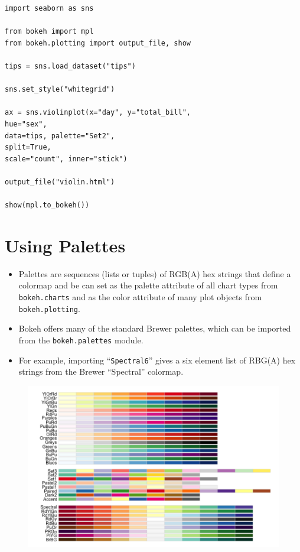 \documentclass[12pt, a4paper]{report}
\begin{document}
\begin{verbatim}
import seaborn as sns

from bokeh import mpl
from bokeh.plotting import output_file, show

tips = sns.load_dataset("tips")

sns.set_style("whitegrid")

ax = sns.violinplot(x="day", y="total_bill", 
hue="sex",
data=tips, palette="Set2", 
split=True,
scale="count", inner="stick")

output_file("violin.html")

show(mpl.to_bokeh())

\end{verbatim}
\newpage

\section*{Using Palettes}
\begin{itemize}
	\item Palettes are sequences (lists or tuples) of RGB(A) hex strings that define a colormap and be can set as the palette attribute of all chart types from \texttt{bokeh.charts} and as the color attribute of many plot objects from \texttt{bokeh.plotting}. 
	\item Bokeh offers many of the standard Brewer palettes, which can be imported from the \texttt{bokeh.palettes} module. 
	\item For example, importing “\texttt{Spectral6}” gives a six element list of RBG(A) hex strings from the Brewer “Spectral” colormap.
\end{itemize}

\begin{figure}[h!]
	\centering
	\includegraphics[width=1.2\linewidth]{images/04-pallettes-brewer}
	
\end{figure}
\end{document}
